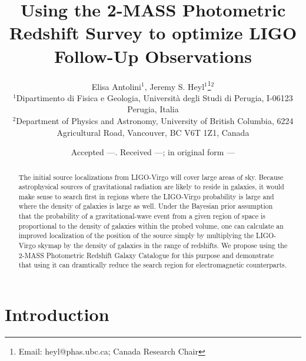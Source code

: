 \documentclass[useAMS,usenatbib]{mn2e}
\title[2MPZ and LIGO]{Using the 2-MASS Photometric Redshift Survey to optimize LIGO Follow-Up Observations}
\author[Antolini \& Heyl]{Elisa Antolini$^{1}$, Jeremy S. Heyl$^{1}$\thanks{Email:
    heyl@phas.ubc.ca; Canada Research Chair}$^{2}$ \\
  $^{1}$Dipartimento di Fisica e Geologia, Universit\`a degli Studi di Perugia, I-06123 Perugia, Italia \\
  $^{2}$Department of Physics and Astronomy, University of British
  Columbia, 6224 Agricultural Road, Vancouver, BC V6T 1Z1, Canada\\
}
\begin{document}
\date{Accepted ---. Received ---; in original form ---}

\pagerange{\pageref{firstpage}--\pageref{lastpage}} 

\maketitle

\label{firstpage}

\begin{abstract}
The initial source localizations from LIGO-Virgo will cover large
areas of sky. Because astrophysical sources of gravitational radiation
are likely to reside in galaxies, it would make sense to search first
in regions where the LIGO-Virgo probability is large and where the
density of galaxies is large as well.  Under the Bayesian prior
assumption that the probability of a gravitational-wave event from a
given region of space is proportional to the density of galaxies
within the probed volume, one can calculate an improved localization
of the position of the source simply by multiplying the LIGO-Virgo
skymap by the density of galaxies in the range of redshifts.  We
propose using the 2-MASS Photometric Redshift Galaxy Catalogue for
this purpose and demonstrate that using it can dramtically reduce the
search region for electromagnetic counterparts.
\end{abstract}

\section{Introduction}
\end{document}
